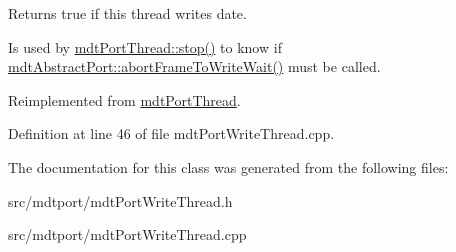 Returns true if this thread writes date. 

Is used by \hyperlink{classmdt_port_thread_a5746ea96689ed80179751ad1353f0b39}{mdtPortThread::stop()} to know if \hyperlink{classmdt_abstract_port_ae67c815f68317c70e398eaa86622af6b}{mdtAbstractPort::abortFrameToWriteWait()} must be called. 

Reimplemented from \hyperlink{classmdt_port_thread_a0122a12262052cf3643241a3eaa31c58}{mdtPortThread}.



Definition at line 46 of file mdtPortWriteThread.cpp.



The documentation for this class was generated from the following files:\begin{DoxyCompactItemize}
\item 
src/mdtport/mdtPortWriteThread.h\item 
src/mdtport/mdtPortWriteThread.cpp\end{DoxyCompactItemize}
